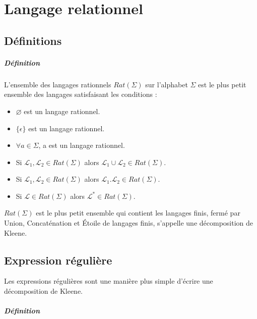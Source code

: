 \chapter{Langage relationnel} %
\label{cha:langage_relationnel}


\section{Définitions} %
\label{sec:d_finitions}


\paragraph{Définition} %
\label{par:d_finition}

L'ensemble des langages rationnels $Rat(\Sigma)$ sur l'alphabet $\Sigma$ est le plus petit ensemble des langages satisfaisant les conditions :

\begin{itemize}
	\item $\varnothing$ est un langage rationnel.
	\item $\{\epsilon\}$ est un langage rationnel.
	\item $\forall a \in \Sigma$, a est un langage rationnel.
	\item Si $\mathcal{L}_1,\mathcal{L}_2 \in Rat(\Sigma)$ alors $\mathcal{L}_1 \cup \mathcal{L}_2 \in Rat(\Sigma)$.
	\item Si $\mathcal{L}_1,\mathcal{L}_2 \in Rat(\Sigma)$ alors $\mathcal{L}_1 . \mathcal{L}_2 \in Rat(\Sigma)$.
	\item Si $\mathcal{L} \in Rat(\Sigma)$ alors $\mathcal{L}^* \in Rat(\Sigma)$.
\end{itemize}


$Rat(\Sigma)$ est le plus petit ensemble qui contient les langages finis, fermé par Union, Concaténation et Étoile de langages finis, s'appelle une décomposition de Kleene.



\section{Expression régulière} %
\label{sec:expression_r_guli_re}

Les expressions régulières sont une manière plus simple d'écrire une décomposition de Kleene.


\paragraph{Définition} %
\label{par:d_finition}

